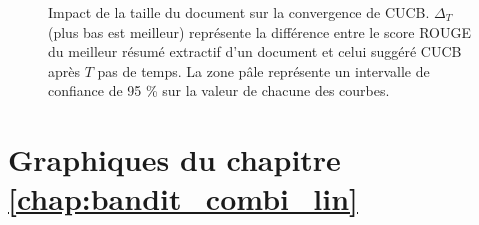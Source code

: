 \begin{figure}[ht!]
    \caption[Impact de la taille du document sur la convergence de CUCB avec intervalle de confiance de 95 \%]
    {Impact de la taille du document sur la convergence de CUCB.
    $\Delta_T$ (plus bas est meilleur) représente la différence entre le score ROUGE du meilleur résumé
    extractif d'un document et celui suggéré CUCB après $T$ pas de temps.
    La zone pâle représente un intervalle de confiance de 95 \% sur la valeur de chacune des courbes.}
\end{figure}

\clearpage

\section*{Graphiques du chapitre \ref{chap:bandit_combi_lin}}

